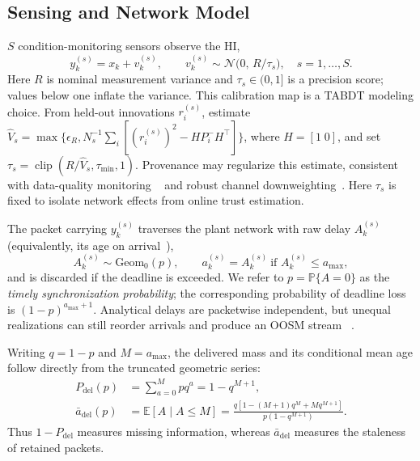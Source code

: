 \documentclass[journal]{IEEEtran}
\newcommand{\E}{\mathbb{E}}
\newcommand{\Prob}{\mathbb{P}}
\begin{document}
\subsection{Sensing and Network Model}
$S$ condition-monitoring sensors observe the HI,
\begin{equation}\label{eq:meas}
y_k^{(s)}=x_k+v_k^{(s)},\qquad
v_k^{(s)}\sim\mathcal{N}\!\bigl(0,\,R/\tau_s\bigr),\quad s=1,\dots,S.
\end{equation}
Here $R$ is nominal measurement variance and $\tau_s\in(0,1]$ is a precision
score; values below one inflate the variance. This calibration map is a TABDT
modeling choice. From held-out innovations $r_i^{(s)}$, estimate
$\widehat V_s=\max\{\epsilon_R,N_s^{-1}\sum_i[(r_i^{(s)})^2-
HP_i^-H^\top]\}$, where $H=[1\;0]$, and set
$\tau_s=\operatorname{clip}(R/\widehat V_s,\tau_{\min},1)$. Provenance may
regularize this estimate, consistent with data-quality monitoring
~\cite{nist2023} and robust channel downweighting~\cite{yang2022jiot}. Here
$\tau_s$ is fixed to isolate network effects from online trust estimation.

The packet carrying $y_k^{(s)}$ traverses the plant network with raw delay
$A_k^{(s)}$ (equivalently, its age on arrival~\cite{yates2021}),
\begin{equation}\label{eq:delay}
A_k^{(s)}\sim\mathrm{Geom}_0(p),\qquad
a_k^{(s)}=A_k^{(s)}\ \text{if }A_k^{(s)}\leq a_{\max},
\end{equation}
and is discarded if the deadline is exceeded. We refer to
$p=\Prob\{A=0\}$ as the \emph{timely synchronization probability}; the
corresponding probability of deadline loss is $(1-p)^{a_{\max}+1}$.
Analytical delays are packetwise independent, but unequal realizations can
still reorder arrivals and produce an OOSM stream
~\cite{barshalom2002,barshalom2004}.

Writing $q=1-p$ and $M=a_{\max}$, the delivered mass and its conditional
mean age follow directly from the truncated geometric series:
\begin{equation}\label{eq:agemoments}
\begin{aligned}
P_{\mathrm{del}}(p)&=\sum_{a=0}^{M}pq^a=1-q^{M+1},\\
\bar a_{\mathrm{del}}(p)&=\E[A\mid A\leq M]
=\frac{q[1-(M+1)q^M+Mq^{M+1}]}{p(1-q^{M+1})}.
\end{aligned}
\end{equation}
Thus $1-P_{\mathrm{del}}$ measures missing information, whereas
$\bar a_{\mathrm{del}}$ measures the staleness of retained packets.
\end{document}
